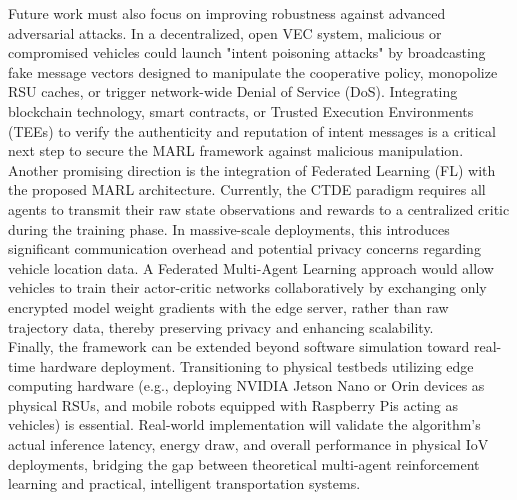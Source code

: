 \documentclass[12pt,a4paper]{report}
\begin{document}
Future work must also focus on improving robustness against advanced adversarial attacks. In a decentralized, open VEC system, malicious or compromised vehicles could launch "intent poisoning attacks" by broadcasting fake message vectors designed to manipulate the cooperative policy, monopolize RSU caches, or trigger network-wide Denial of Service (DoS). Integrating blockchain technology, smart contracts, or Trusted Execution Environments (TEEs) to verify the authenticity and reputation of intent messages is a critical next step to secure the MARL framework against malicious manipulation.\\

Another promising direction is the integration of Federated Learning (FL) with the proposed MARL architecture. Currently, the CTDE paradigm requires all agents to transmit their raw state observations and rewards to a centralized critic during the training phase. In massive-scale deployments, this introduces significant communication overhead and potential privacy concerns regarding vehicle location data. A Federated Multi-Agent Learning approach would allow vehicles to train their actor-critic networks collaboratively by exchanging only encrypted model weight gradients with the edge server, rather than raw trajectory data, thereby preserving privacy and enhancing scalability.\\

Finally, the framework can be extended beyond software simulation toward real-time hardware deployment. Transitioning to physical testbeds utilizing edge computing hardware (e.g., deploying NVIDIA Jetson Nano or Orin devices as physical RSUs, and mobile robots equipped with Raspberry Pis acting as vehicles) is essential. Real-world implementation will validate the algorithm's actual inference latency, energy draw, and overall performance in physical IoV deployments, bridging the gap between theoretical multi-agent reinforcement learning and practical, intelligent transportation systems.

\newpage

\end{document}
